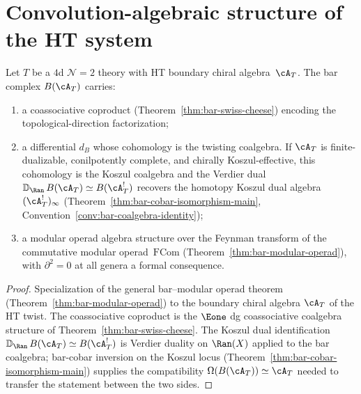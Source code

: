 \section{Convolution-algebraic structure of the HT system}
\label{sec:ht-convolution-structure}

\begin{proposition}
\label{prop:ht-bar-genus-zero}
Let $T$ be a $4$d $\mathcal{N}=2$ theory with HT boundary chiral
algebra~$\cA_T$. The bar complex $B(\cA_T)$ carries:
\begin{enumerate}[label=\textup{(\roman*)}]
\item a coassociative coproduct
 \textup{(}Theorem~\textup{\ref{thm:bar-swiss-cheese}}\textup{)}
 encoding the topological-direction factorization;
\item a differential $d_B$ whose cohomology is the twisting coalgebra.
 If $\cA_T$ is finite-dualizable, conilpotently complete, and
 chirally Koszul-effective, this cohomology is the Koszul coalgebra and
 the Verdier dual
 $\mathbb{D}_{\Ran}\,B(\cA_T) \simeq B(\cA_T^!)$
 recovers the homotopy Koszul dual algebra $(\cA_T^!)_\infty$
 \textup{(}Theorem~\textup{\ref{thm:bar-cobar-isomorphism-main}},
 Convention~\textup{\ref{conv:bar-coalgebra-identity}}\textup{)};
\item a modular operad algebra structure over the Feynman transform of
 the commutative modular operad~$\mathrm{FCom}$
 \textup{(}Theorem~\textup{\ref{thm:bar-modular-operad}}\textup{)},
 with $\partial^2 = 0$ at all genera a formal consequence.
\end{enumerate}
\end{proposition}

\begin{proof}
Specialization of the general bar--modular operad theorem
(Theorem~\ref{thm:bar-modular-operad}) to the boundary chiral
algebra $\cA_T$ of the HT twist. The coassociative coproduct is
the $\Eone$ dg coassociative coalgebra structure of
Theorem~\ref{thm:bar-swiss-cheese}. The Koszul dual identification
$\mathbb{D}_{\Ran}\,B(\cA_T) \simeq B(\cA_T^!)$ is Verdier
duality on $\Ran(X)$ applied to the bar coalgebra; bar-cobar
inversion on the Koszul locus
(Theorem~\ref{thm:bar-cobar-isomorphism-main}) supplies the
compatibility $\Omega(B(\cA_T)) \simeq \cA_T$ needed to transfer
the statement between the two sides.
\end{proof}

